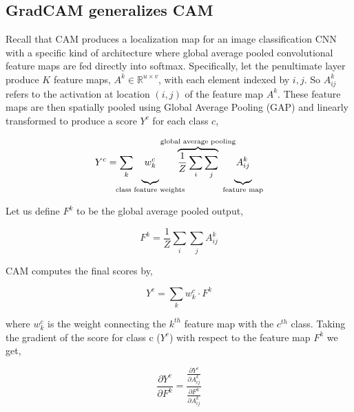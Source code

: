 \subsection{GradCAM generalizes CAM}
\label{sec:generalization}
\noindent Recall that CAM produces a localization map for an image classification
CNN with a specific kind of architecture where global average pooled convolutional feature maps
are fed directly into softmax.
Specifically, let the penultimate layer produce $K$ feature maps,
$A^k \in \mathbb{R}^{u \times v}$, with each element indexed by $i,j$.
So $A_{ij}^k$ refers to the activation at location $(i,j)$ of the feature map $A^k$.
These feature maps are then spatially pooled using Global Average Pooling (GAP)
and linearly transformed to produce a score $Y^c$ for each class $c$,
\begin{center}
\begin{equation} \label{eq:scores}
    Y^c = \sum_{k}
	\hspace{-20pt}
    \underbrace{
        \vphantom{\frac{1}{Z}\sum_i \sum_j} w^c_k
    }_{\vspace{-3pt}
	\text{class feature weights}}
    \hspace{-27pt}
    \overbrace{
        \frac{1}{Z}\sum_i \sum_j
    }^{\text{global average pooling}}
    \hspace{-15pt}
    \underbrace{
        \vphantom{\frac{1}{Z}\sum_i \sum_j} A^k_{ij}
    }_{\vspace{-5pt}\text{feature map}}
\end{equation}
\end{center}




Let us define $F^k$ to be the global average pooled output,
\begin{center}
\begin{equation}\label{eq:cam_gap}
    F^{k} = \frac{1}{Z} \sum_{i} \sum_{j} A_{ij}^k
\end{equation}
\end{center}

CAM computes the final scores by,
\begin{center}
\begin{equation}\label{eq:cam_scores}
    Y^c = \sum_{k} w_{k}^c \cdot F^{k}
\end{equation}
\end{center}
where $w_{k}^c$ is the weight connecting the $k^{th}$ feature map with the $c^{th}$ class.
Taking the gradient of the score for class c ($Y^c$)  with respect to the feature map $F^k$ we get,
\begin{center}
\begin{equation}\label{eq:cam_grad}
    \frac{\partial Y^c}{\partial F^k} = \frac{\frac{\partial Y^c}{\partial A_{ij}^k}}{\frac{\partial F^k}{\partial A_{ij}^k}}
\end{equation}
\end{center}


